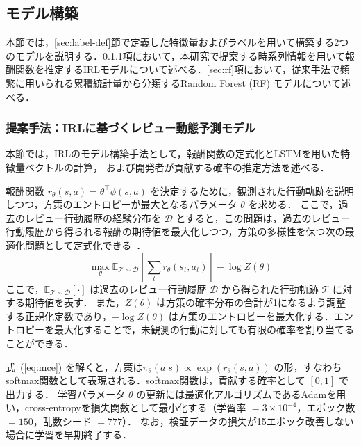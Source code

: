 \documentclass[submit,noauthor,ses,dvipdfmx]{ipsj}
\begin{document}
\vspace{-4mm}
\subsection{モデル構築}

本節では，\ref{sec:label-def}節で定義した特徴量およびラベルを用いて構築する2つのモデルを説明する．\ref{sec:irl}項において，本研究で提案する時系列情報を用いて報酬関数を推定するIRLモデルについて述べる．\ref{sec:rf}項において，従来手法で頻繁に用いられる累積統計量から分類するRandom Forest (RF) モデルについて述べる．

\subsubsection{提案手法：IRLに基づくレビュー動態予測モデル}\label{sec:irl}

本節では，IRLのモデル構築手法として，報酬関数の定式化とLSTMを用いた特徴量ベクトルの計算，
および開発者が貢献する確率の推定方法を述べる．

報酬関数 $r_\theta(s,a) = \theta^\top \phi(s,a)$ を決定するために，観測された行動軌跡を説明しつつ，方策のエントロピーが最大となるパラメータ $\theta$ を求める．
ここで，過去のレビュー行動履歴の経験分布を $\mathcal{D}$ とすると，この問題は，過去のレビュー行動履歴から得られる報酬の期待値を最大化しつつ，方策の多様性を保つ次の最適化問題として定式化できる~\cite{ziebart}．
\begin{equation}
\max_\theta \mathbb{E}_{\mathcal{T} \sim \mathcal{D}}
\left[\sum_t r_\theta(s_t, a_t)\right] - \log Z(\theta)
\label{eq:mce}
\end{equation}
ここで，$\mathbb{E}_{\mathcal{T} \sim \mathcal{D}}[\cdot]$ は過去のレビュー行動履歴 $\mathcal{D}$ から得られた行動軌跡 $\mathcal{T}$ に対する期待値を表す．
また，$Z(\theta)$ は方策の確率分布の合計が1になるよう調整する正規化定数であり，$-\log Z(\theta)$ は方策のエントロピーを最大化する．エントロピーを最大化することで，未観測の行動に対しても有限の確率を割り当てることができる．

式~(\ref{eq:mce}) を解くと，方策は$\pi_\theta(a|s) \propto \exp(r_\theta(s,a))$ の形，すなわちsoftmax関数として表現される．softmax関数は，貢献する確率として $[0, 1]$ で出力する．
学習パラメータ $\theta$ の更新には最適化アルゴリズムであるAdam\cite{adam}を用い，cross-entropyを損失関数として最小化する（学習率 $= 3\times10^{-4}$，エポック数 $= 150$，乱数シード $= 777$）．
なお，検証データの損失が15エポック改善しない場合に学習を早期終了する．
\end{document}
